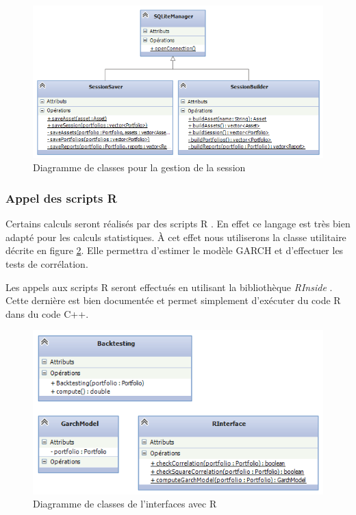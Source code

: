 \documentclass[a4paper,titlepage,french]{report}
\begin{document}
\begin{figure}
  	\center
  	\includegraphics[width=1\textwidth]{diagramme-classes-interface-bdd.png}
  	\caption{Diagramme de classes pour la gestion de la session}
  	\label{fig:diagramme-classes-interface-bdd}
\end{figure}


\subsubsection{Appel des scripts R}

Certains calculs seront réalisés par des scripts R \cite{website:R}.
En effet ce langage est très bien adapté pour les calculs statistiques.
\`A cet effet nous utiliserons la classe utilitaire décrite en figure \ref{fig:diagramme-classes-interface-r}.
Elle permettra d'estimer le modèle GARCH et d'effectuer les tests de corrélation.

Les appels aux scripts R seront effectués en utilisant la bibliothèque \textit{RInside} \cite{website:RInside}. Cette dernière est bien documentée et permet simplement d'exécuter du code R dans du code C++.

\begin{figure}
  	\center
  	\includegraphics[width=1\textwidth]{diagramme-classes-interface-r.png}
  	\caption{Diagramme de classes de l'interfaces avec R}
  	\label{fig:diagramme-classes-interface-r}
\end{figure}
\end{document}
